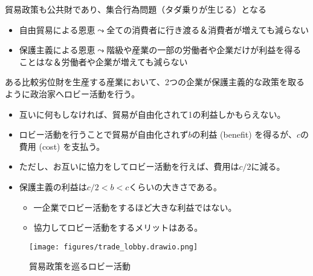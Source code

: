 \documentclass[
  xelatex,
  ja=standard]{bxjsarticle}
\providecommand{\tightlist}{%
  \setlength{\itemsep}{0pt}\setlength{\parskip}{0pt}}\usepackage{longtable,booktabs,array}
\begin{document}
貿易政策も公共財であり、集合行為問題（タダ乗りが生じる）となる

\begin{itemize}
\tightlist
\item
  自由貿易による恩恵\(\leadsto\)全ての消費者に行き渡る＆消費者が増えても減らない
\item
  保護主義による恩恵\(\leadsto\)階級や産業の一部の労働者や企業だけが利益を得ることはな＆労働者や企業が増えても減らない
\end{itemize}

\begin{tcolorbox}[enhanced jigsaw, left=2mm, colframe=quarto-callout-tip-color-frame, colback=white, coltitle=black, rightrule=.15mm, title=\textcolor{quarto-callout-tip-color}{\faLightbulb}\hspace{0.5em}{貿易政策を巡るロビー活動}, arc=.35mm, toprule=.15mm, bottomrule=.15mm, leftrule=.75mm, bottomtitle=1mm, toptitle=1mm, titlerule=0mm, breakable, opacitybacktitle=0.6, colbacktitle=quarto-callout-tip-color!10!white, opacityback=0]

ある比較劣位財を生産する産業において、2つの企業が保護主義的な政策を取るように政治家へロビー活動を行う。

\begin{itemize}
\tightlist
\item
  互いに何もしなければ、貿易が自由化されて1の利益しかもらえない。
\item
  ロビー活動を行うことで貿易が自由化されず\(b\)の利益 (benefit)
  を得るが、\(c\)の費用 (cost) を支払う。
\item
  ただし、お互いに協力をしてロビー活動を行えば、費用は\(c/2\)に減る。
\item
  保護主義の利益は\(c/2 < b < c\)くらいの大きさである。

  \begin{itemize}
  \tightlist
  \item
    一企業でロビー活動をするほど大きな利益ではない。
  \item
    協力してロビー活動をするメリットはある。
  \end{itemize}
\end{itemize}

\end{tcolorbox}

\begin{figure}[htpb]

{\centering \texttt{[image: figures/trade\_lobby.drawio.png]}

}

\caption{貿易政策を巡るロビー活動}

\end{figure}
\end{document}
